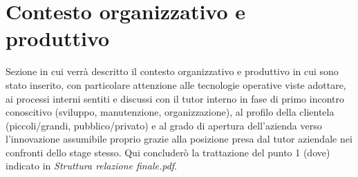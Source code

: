 \section{Contesto organizzativo e produttivo}

Sezione in cui verrà descritto il contesto organizzativo e produttivo in cui sono stato inserito, con particolare attenzione alle tecnologie operative viste adottare, ai processi interni sentiti e discussi con il tutor interno in fase di primo incontro conoscitivo (sviluppo, manutenzione, organizzazione), al profilo della clientela (piccoli/grandi, pubblico/privato) e al grado di apertura dell’azienda verso l’innovazione assumibile proprio grazie alla posizione presa dal tutor aziendale nei confronti dello stage stesso. 
Qui concluderò la trattazione del punto 1 (dove) indicato in \textit{Struttura relazione finale.pdf}.